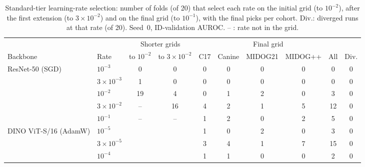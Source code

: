 \begin{table}[width=\linewidth,pos=t]
\caption{Standard-tier learning-rate selection: number of folds (of 20) that
select each rate on the initial grid (to $10^{-2}$), after the first extension
(to $3\times10^{-2}$) and on the final grid (to $10^{-1}$), with the final
picks per cohort. Div.: diverged runs at that rate (of 20). Seed~0, ID-validation
AUROC. -- : rate not in the grid.}
\label{tab:tuning-lr}
\footnotesize
\begin{tabular*}{\tblwidth}{@{\extracolsep{\fill}}llcccccccc@{}}
\toprule
 & & \multicolumn{2}{c}{Shorter grids} & \multicolumn{5}{c}{Final grid} & \\
\cmidrule(lr){3-4}\cmidrule(lr){5-9}
Backbone & Rate & to $10^{-2}$ & to $3{\times}10^{-2}$ & C17 & Canine & MIDOG21 & MIDOG++ & All & Div. \\
\midrule
ResNet-50 (SGD) & $10^{-3}$ & 0 & 0 & 0 & 0 & 0 & 0 & 0 & 0 \\
 & $3{\times}10^{-3}$ & 1 & 0 & 0 & 0 & 0 & 0 & 0 & 0 \\
 & $10^{-2}$ & 19 & 4 & 0 & 1 & 2 & 0 & 3 & 0 \\
 & $3{\times}10^{-2}$ & -- & 16 & 4 & 2 & 1 & 5 & 12 & 0 \\
 & $10^{-1}$ & -- & -- & 1 & 2 & 0 & 2 & 5 & 0 \\
\addlinespace
DINO ViT-S/16 (AdamW) & $10^{-5}$ & & & 1 & 0 & 2 & 0 & 3 & 0 \\
 & $3{\times}10^{-5}$ & & & 3 & 4 & 1 & 7 & 15 & 0 \\
 & $10^{-4}$ & & & 1 & 1 & 0 & 0 & 2 & 0 \\
\bottomrule
\end{tabular*}
\end{table}

